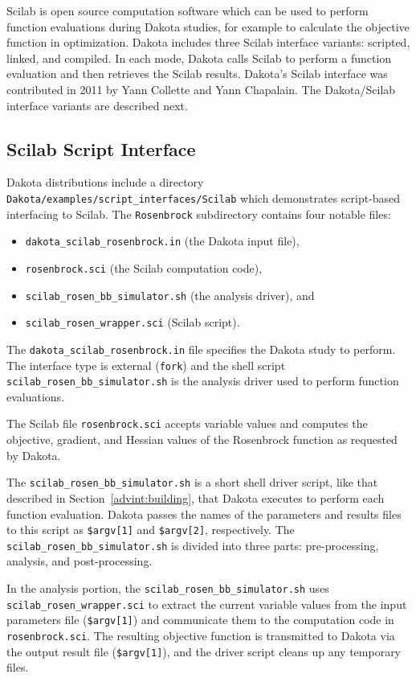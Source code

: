Scilab is open source computation software which can be used to
perform function evaluations during Dakota studies, for example to
calculate the objective function in optimization. Dakota includes
three Scilab interface variants: scripted, linked, and compiled. In
each mode, Dakota calls Scilab to perform a function evaluation and
then retrieves the Scilab results. Dakota's Scilab interface was
contributed in 2011 by Yann Collette and Yann Chapalain. The
Dakota/Scilab interface variants are described next.

\subsection{Scilab Script Interface} 

Dakota distributions include a directory
\texttt{Dakota/examples/script\_interfaces/Scilab} which demonstrates
script-based interfacing to Scilab. The {\tt Rosenbrock} subdirectory
contains four notable files:
\begin{itemize}
  \item \texttt{dakota\_scilab\_rosenbrock.in} (the Dakota input file),
  \item \texttt{rosenbrock.sci} (the Scilab computation code),
  \item \texttt{scilab\_rosen\_bb\_simulator.sh} (the analysis driver), and
  \item \texttt{scilab\_rosen\_wrapper.sci} (Scilab script).
\end{itemize}

The \texttt{dakota\_scilab\_rosenbrock.in} file specifies the Dakota
study to perform. The interface type is external ({\tt fork}) and the
shell script \texttt{scilab\_rosen\_bb\_simulator.sh} is the analysis
driver used to perform function evaluations.

The Scilab file \texttt{rosenbrock.sci} accepts variable values and
computes the objective, gradient, and Hessian values of the Rosenbrock
function as requested by Dakota.

The \texttt{scilab\_rosen\_bb\_simulator.sh} is a short shell driver
script, like that described in Section~\ref{advint:building}, that
Dakota executes to perform each function evaluation. Dakota passes
the names of the parameters and results files to this script as
\texttt{\$argv[1]} and \texttt{\$argv[2]}, respectively. The
\texttt{scilab\_rosen\_bb\_simulator.sh} is divided into three parts:
pre-processing, analysis, and post-processing.

In the analysis portion, the \texttt{scilab\_rosen\_bb\_simulator.sh}
uses \texttt{scilab\_rosen\_wrapper.sci} to extract the current
variable values from the input parameters file (\texttt{\$argv[1]})
and communicate them to the computation code in
\texttt{rosenbrock.sci}. The resulting objective function is
transmitted to Dakota via the output result file (\texttt{\$argv[1]}),
and the driver script cleans up any temporary files.


